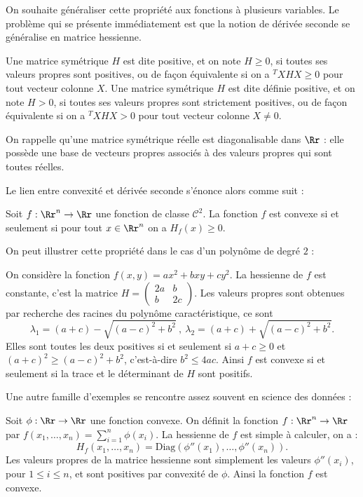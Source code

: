 On souhaite généraliser cette propriété aux fonctions à plusieurs variables. Le problème qui se présente immédiatement est que la notion de dérivée seconde se généralise en matrice hessienne.

\begin{definition}{}{}
	Une matrice symétrique $H$ est dite positive, et on note $H \ge 0$, si toutes ses valeurs propres sont positives, ou de façon équivalente si on a ${}^TX H X \ge 0$ pour tout vecteur colonne $X$.
	Une matrice symétrique $H$ est dite définie positive, et on note $H > 0$, si toutes ses valeurs propres sont strictement positives, ou de façon équivalente si on a ${}^TX H X > 0$ pour tout vecteur colonne $X \neq 0$. 
\end{definition}

On rappelle qu'une matrice symétrique réelle est diagonalisable dans $\Rr$ : elle possède une base de vecteurs propres associés à des valeurs propres qui sont toutes réelles.

\bigskip

Le lien entre convexité et dérivée seconde s'énonce alors comme suit : 
\begin{proposition}{}{}
	Soit $f : \Rr^n \to \Rr$ une fonction de classe $\mathcal{C}^2$. La fonction $f$ est convexe si et seulement si pour tout $x \in \Rr^n$ on a $H_f(x) \ge 0$.
\end{proposition}

On peut illustrer cette propriété dans le cas d'un polynôme de degré $2$ : 

\begin{exemple}{}{}
	On considère la fonction $f(x,y) = a x^2 + b xy + c y^2$. La hessienne de $f$ est constante, c'est la matrice $H = \begin{pmatrix} 2a & b \\ b & 2c \end{pmatrix}$. Les valeurs propres sont obtenues par recherche des racines du polynôme caractéristique, ce sont $$\lambda_1 = (a+c) - \sqrt{(a-c)^2+b^2} \ , \ \lambda_2 = (a+c) + \sqrt{(a-c)^2+b^2}.$$ Elles sont toutes les deux positives si et seulement si $a+c \ge 0$ et $(a+c)^2 \ge (a-c)^2+b^2$, c'est-à-dire $b^2 \le 4 ac$. Ainsi $f$ est convexe si et seulement si la trace et le déterminant de $H$ sont positifs.
\end{exemple}

Une autre famille d'exemples se rencontre assez souvent en science des données : 

\begin{exemple}{}{}
	Soit $\phi : \Rr \to \Rr$ une fonction convexe. On définit la fonction $f : \Rr^n \to \Rr$ par $f(x_1,\ldots,x_n) = \sum_{i=1}^n \phi(x_i)$. La hessienne de $f$ est simple à calculer, on a : $$H_f(x_1,\ldots,x_n) = \textrm{Diag}(\phi''(x_1),\ldots,\phi''(x_n)).$$ Les valeurs propres de la matrice hessienne sont simplement les valeurs $\phi''(x_i)$, pour $1 \le i \le n$, et sont positives par convexité de $\phi$. Ainsi la fonction $f$ est convexe.
\end{exemple}


